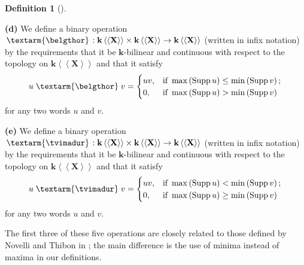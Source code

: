 \documentclass
[numbers=enddot,12pt,final,onecolumn,notitlepage,abstracton]{scrartcl}%
\theoremstyle{definition}
\newtheorem{defi}[theo]{Definition}
\newenvironment{definition}[1][]
{\begin{defi}[#1]\begin{leftbar}}
{\end{leftbar}\end{defi}}
\newcommand{\tvi}{\left. \textarm{\tvimadur} \right.}
\newcommand{\bel}{\left. \textarm{\belgthor} \right.}
\begin{document}
\begin{definition}
\textbf{(d)} We define a binary operation $\bel :\mathbf{k}\left\langle
\left\langle \mathbf{X}\right\rangle \right\rangle \times\mathbf{k}%
\left\langle \left\langle \mathbf{X}\right\rangle \right\rangle \rightarrow
\mathbf{k}\left\langle \left\langle \mathbf{X}\right\rangle \right\rangle $
(written in infix notation) by the requirements that it be $\mathbf{k}%
$-bilinear and continuous with respect to the topology on $\mathbf{k}%
\left\langle \left\langle \mathbf{X}\right\rangle \right\rangle $ and that it
satisfy%
\[
u \bel v=
\begin{cases}
uv, & \text{if }\max\left(  \operatorname*{Supp}u\right)  \leq\min\left(
\operatorname*{Supp}v\right)  ;\\
0, & \text{if }\max\left(  \operatorname*{Supp}u\right)  >\min\left(
\operatorname*{Supp}v\right)
\end{cases}
\]
for any two words $u$ and $v$.

\textbf{(e)} We define a binary operation $\tvi :\mathbf{k}\left\langle
\left\langle \mathbf{X}\right\rangle \right\rangle \times\mathbf{k}%
\left\langle \left\langle \mathbf{X}\right\rangle \right\rangle \rightarrow
\mathbf{k}\left\langle \left\langle \mathbf{X}\right\rangle \right\rangle $
(written in infix notation) by the requirements that it be $\mathbf{k}%
$-bilinear and continuous with respect to the topology on $\mathbf{k}%
\left\langle \left\langle \mathbf{X}\right\rangle \right\rangle $ and that it
satisfy%
\[
u \tvi v=
\begin{cases}
uv, & \text{if }\max\left(  \operatorname*{Supp}u\right)  <\min\left(
\operatorname*{Supp}v\right)  ;\\
0, & \text{if }\max\left(  \operatorname*{Supp}u\right)  \geq\min\left(
\operatorname*{Supp}v\right)
\end{cases}
\]
for any two words $u$ and $v$.
\end{definition}

The first three of these five operations are closely related to those defined
by Novelli and Thibon in \cite{NoThi05}; the main difference is the use of
minima instead of maxima in our definitions.
\end{document}
